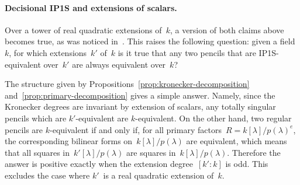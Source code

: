 \documentclass{lms}
\begin{document}
% 

\paragraph{Decisional IP1S and extensions of scalars.}

Over a tower of real quadratic extensions of~$k$,
a version of both claims above becomes true,
as was noticed in~\cite[6.1]{2013bfp}.
This raises the following question: given a field~$k$,
for which extensions~$k'$ of~$k$ is it true that
any two pencils that are IP1S-equivalent over~$k'$
are always equivalent over~$k$?

The structure given by Propositions~\ref{prop:kronecker-decomposition}
and~\ref{prop:primary-decomposition} gives a simple answer.
Namely, since the Kronecker degrees are invariant by extension of scalars,
any totally singular pencils which are $k'$-equivalent are $k$-equivalent.
On the other hand, two regular pencils are $k$-equivalent
if and only if, for all primary factors~$R =k[λ]/p(λ)^e$,
the corresponding bilinear forms on~$k[λ]/p(λ)$ are equivalent,
which means that all squares in~$k'[λ]/p(λ)$
are squares in~$k[λ]/p(λ)$.
Therefore the answer is positive exactly when
the extension degree~$[k':k]$ is odd.
This excludes the case where $k'$~is a
real quadratic extension of~$k$.

\end{document}
